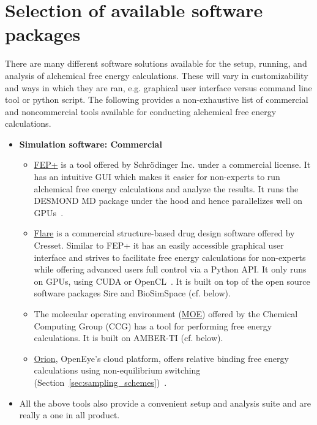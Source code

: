 \documentclass[9pt,bestpractices]{livecoms}
\begin{document}
\section{Selection of available software packages}

\label{sec:software}
There are many different software solutions available for the setup, running, and analysis of alchemical free energy calculations. These will vary in customizability and ways in which they are ran, e.g. graphical user interface versus command line tool or python script. The following provides a non-exhaustive list of commercial and noncommercial tools available for conducting alchemical free energy calculations. 
\begin{itemize}

\item [] \textbf{Simulation software: Commercial}
   \begin{itemize}
    \item \href{https://www.schrodinger.com/fep}{FEP+} is a tool offered by Schr\"{o}dinger Inc. under a commercial license. It has an intuitive GUI which makes it easier for non-experts to run alchemical free energy calculations and analyze the results. It runs the DESMOND MD package under the hood and hence parallelizes well on GPUs~\cite{wang2015accurate}. 
    \item \href{https://www.cresset-group.com/software/flare/}{Flare} is a commercial structure-based drug design software offered by Cresset. Similar to FEP+ it has an easily accessible graphical user interface and strives to facilitate free energy calculations for non-experts while offering advanced users full control via a Python API. It only runs on GPUs, using CUDA or OpenCL~\cite{kuhn2020assessment}. It is built on top of the open source software packages Sire and BioSimSpace (cf. below).
     \item The molecular operating environment (\href{https://www.chemcomp.com/Products.htm}{MOE}) offered by the Chemical Computing Group (CCG) has a tool for performing free energy calculations. It is built on AMBER-TI (cf. below).
    \item \href{https://www.eyesopen.com/orion}{Orion}, OpenEye's cloud platform, offers relative binding free energy calculations using non-equilibrium switching (Section~\ref{sec:sampling_schemes})~\cite{sorensen2024orion}.
    \end{itemize}
    \item[]All the above tools also provide a convenient setup and analysis suite and are really a one in all product. \newline

\end{itemize}
\end{document}

